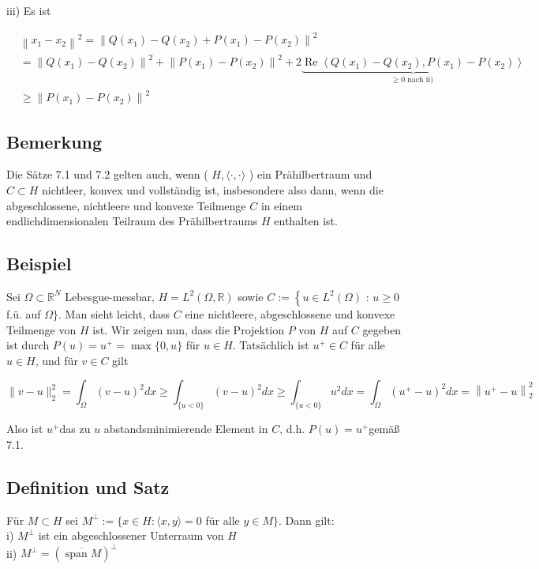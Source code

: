 \documentclass[10pt, letterpaper]{article}
\begin{document}
iii) Es ist

$$
\begin{aligned}
& \left\|x_{1}-x_{2}\right\|^{2}=\left\|Q\left(x_{1}\right)-Q\left(x_{2}\right)+P\left(x_{1}\right)-P\left(x_{2}\right)\right\|^{2} \\
& =\left\|Q\left(x_{1}\right)-Q\left(x_{2}\right)\right\|^{2}+\left\|P\left(x_{1}\right)-P\left(x_{2}\right)\right\|^{2}+2 \underbrace{\operatorname{Re}\left\langle Q\left(x_{1}\right)-Q\left(x_{2}\right), P\left(x_{1}\right)-P\left(x_{2}\right)\right\rangle}_{\geq 0 \text { nach ii) }} \\
& \geq\left\|P\left(x_{1}\right)-P\left(x_{2}\right)\right\|^{2}
\end{aligned}
$$

\subsection*{Bemerkung}
Die Sätze 7.1 und 7.2 gelten auch, wenn ( $H,\langle\cdot, \cdot\rangle$ ) ein Prähilbertraum und $C \subset H$ nichtleer, konvex und vollständig ist, insbesondere also dann, wenn die abgeschlossene, nichtleere und konvexe Teilmenge $C$ in einem endlichdimensionalen Teilraum des Prähilbertraums $H$ enthalten ist.

\subsection*{Beispiel}
Sei $\Omega \subset \mathbb{R}^{N}$ Lebesgue-messbar, $H=L^{2}(\Omega, \mathbb{R})$ sowie $C:=\left\{u \in L^{2}(\Omega)\right.$ : $u \geq 0$ f.ü. auf $\Omega\}$. Man sieht leicht, dass $C$ eine nichtleere, abgeschlossene und konvexe Teilmenge von $H$ ist. Wir zeigen nun, dass die Projektion $P$ von $H$ auf $C$ gegeben ist durch $P(u)=u^{+}=\max \{0, u\}$ für $u \in H$. Tatsächlich ist $u^{+} \in C$ für alle $u \in H$, und für $v \in C$ gilt

$$
\|v-u\|_{2}^{2}=\int_{\Omega}(v-u)^{2} d x \geq \int_{\{u<0\}}(v-u)^{2} d x \geq \int_{\{u<0\}} u^{2} d x=\int_{\Omega}\left(u^{+}-u\right)^{2} d x=\left\|u^{+}-u\right\|_{2}^{2}
$$

Also ist $u^{+}$das zu $u$ abstandsminimierende Element in $C$, d.h. $P(u)=u^{+}$gemäß 7.1.

\subsection*{Definition und Satz}
Für $M \subset H$ sei $M^{\perp}:=\{x \in H:\langle x, y\rangle=0$ für alle $y \in M\}$. Dann gilt:\\
i) $M^{\perp}$ ist ein abgeschlossener Unterraum von $H$\\
ii) $M^{\perp}=(\overline{\operatorname{span} M})^{\perp}$
\end{document}

